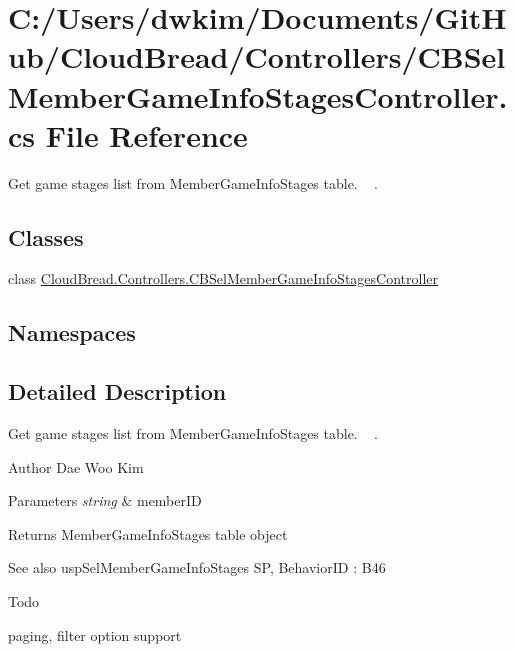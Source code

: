 \hypertarget{a00149}{}\section{C\+:/\+Users/dwkim/\+Documents/\+Git\+Hub/\+Cloud\+Bread/\+Controllers/\+C\+B\+Sel\+Member\+Game\+Info\+Stages\+Controller.cs File Reference}
\label{a00149}


Get game stages list from Member\+Game\+Info\+Stages table. ~\newline
.  


\subsection*{Classes}
\begin{DoxyCompactItemize}
\item 
class \hyperlink{a00037}{Cloud\+Bread.\+Controllers.\+C\+B\+Sel\+Member\+Game\+Info\+Stages\+Controller}
\end{DoxyCompactItemize}
\subsection*{Namespaces}
\begin{DoxyCompactItemize}
\end{DoxyCompactItemize}


\subsection{Detailed Description}
Get game stages list from Member\+Game\+Info\+Stages table. ~\newline
. 

\begin{DoxyAuthor}{Author}
Dae Woo Kim 
\end{DoxyAuthor}

\begin{DoxyParams}{Parameters}
{\em string} & member\+ID \\
\hline
\end{DoxyParams}
\begin{DoxyReturn}{Returns}
Member\+Game\+Info\+Stages table object 
\end{DoxyReturn}
\begin{DoxySeeAlso}{See also}
usp\+Sel\+Member\+Game\+Info\+Stages SP, Behavior\+ID \+: B46 
\end{DoxySeeAlso}
\begin{DoxyRefDesc}{Todo}
\item[\hyperlink{a00001__todo000014}{Todo}]paging, filter option support \end{DoxyRefDesc}
